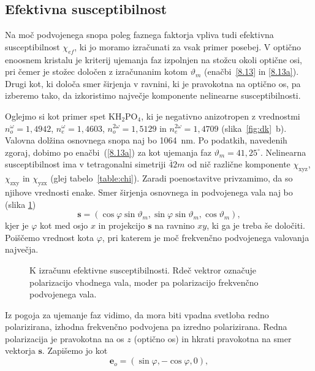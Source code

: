 \subsection*{Efektivna susceptibilnost}
Na moč podvojenega snopa poleg faznega faktorja vpliva tudi efektivna 
susceptibilnost $\chi_{ef}$, ki jo moramo izračunati za vsak primer posebej. 
V optično enoosnem kristalu
je kriterij ujemanja faz izpolnjen na stožcu okoli optične osi, pri čemer je stožec določen 
z izračunanim kotom $\vartheta_m$ (enačbi~\ref{8.13} in \ref{8.13a}). 
Drugi kot, ki določa smer širjenja v ravnini, ki je pravokotna na optično os, pa 
izberemo tako, da izkoristimo največje komponente nelinearne 
susceptibilnosti. 

Oglejmo si kot primer spet KH$_{2}$PO$_{4}$, ki je negativno anizotropen 
z vrednostmi $n_o^{\omega} = 1,4942$, 
$n_e^{\omega} = 1,4603$, $n_o^{2\omega} = 1,5129$ in $n_e^{2\omega} = 1,4709$
(slika~\ref{fig:dk}~b). Valovna dolžina osnovnega snopa naj bo 1064~nm. 
Po podatkih, navedenih zgoraj, dobimo po enačbi~(\ref{8.13a}) za kot ujemanja faz 
$\vartheta_m = 41,25^\circ$. Nelinearna susceptibilnost ima v tetragonalni
simetriji $\bar{4}2m$ od nič različne komponente $\chi_\textrm{xyz}$, 
$\chi_\textrm{zxy}$ in $\chi_\textrm{yzx}$ (glej tabelo~\ref{table:chi}). 
Zaradi poenostavitve privzamimo, da so njihove vrednosti enake. 
Smer širjenja osnovnega in podvojenega vala naj bo (slika \ref{fig:chi})
\begin{equation}
\mathbf{s}=(\cos\varphi\sin\vartheta_m,\sin\varphi\sin\vartheta_m,\cos\vartheta_m),
\label{8.14}
\end{equation}
kjer je $\varphi$ kot med osjo $x$ in projekcijo $\mathbf{s}$ na ravnino
$xy$, ki ga je treba še določiti. Poiščemo vrednost kota $\varphi$, pri katerem je 
moč frekvenčno podvojenega valovanja največja.
\begin{figure}[h]
\centering
\def\svgwidth{70truemm} 

\caption{K izračunu efektivne susceptibilnosti. Rdeč vektror označuje
polarizacijo vhodnega vala, moder pa polarizacijo frekvenčno podvojenega vala.}
\label{fig:chi}
\end{figure}
Iz pogoja za ujemanje faz vidimo, da mora biti vpadna svetloba redno polarizirana, 
izhodna frekvenčno podvojena pa izredno polarizirana. Redna polarizacija je pravokotna na 
os $z$ (optično os) in hkrati pravokotna na smer vektorja $\mathbf{s}$. Zapišemo jo kot
\begin{equation}
\mathbf{e}_o=(\sin\varphi,-\cos\varphi,0),
\label{8.15}
\end{equation}
